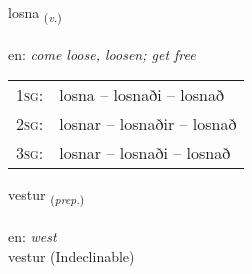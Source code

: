 \documentclass[frontgrid, backgrid]{flacards}\usepackage[]{graphicx}\usepackage[]{color}
\begin{document}
\renewcommand{\blhead}{\vskip5pt {\small\bfseries\footnotesize Sagnorð | Verb }}
\renewcommand{\bcfoot}{\vskip5pt \hspace{2pt}{\small\bfseries\footnotesize 2K}}


{losna \small{\textsubscript{(\textit{v.})}} \\[1ex] %
\textphonetic{[lɔstna]} \\
en: \emph{come loose, loosen; get free} \\  [2ex]
\renewcommand*{\arraystretch}{0.8}
\begin{tabular}{p{1cm}l}
\textsc{1sg}: & losna -- losnaði -- losnað \\ 
\textsc{2sg}: & losnar -- losnaðir -- losnað \\ 
\textsc{3sg}: & losnar -- losnaði -- losnað \\ 
\end{tabular}
}


\renewcommand{\flhead}{\vskip5pt \fboxsep=0pt {\small\bfseries\footnotesize Forsetning | Preposition}}
\renewcommand{\fcfoot}{\vskip5pt \fboxsep=0pt \hspace{2pt}{\small\bfseries\footnotesize 2K}}

\renewcommand{\blhead}{\vskip5pt {\small\bfseries\footnotesize Forsetning | Preposition }}
\renewcommand{\bcfoot}{\vskip5pt \hspace{2pt}{\small\bfseries\footnotesize 2K}}


{vestur \small{\textsubscript{(\textit{prep.})}} \\[1ex]
\textphonetic{[vɛstʏr]} \\
en: \emph{west} \\  [2ex]
vestur (Indeclinable)}


\renewcommand{\flhead}{\vskip5pt \fboxsep=0pt {\small\bfseries\footnotesize Forsetning | Preposition}}
\renewcommand{\fcfoot}{\vskip5pt \fboxsep=0pt \hspace{2pt}{\small\bfseries\footnotesize 2K}}
\end{document}
